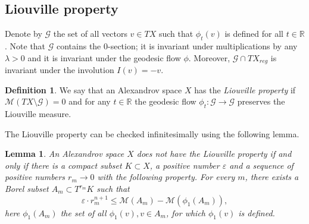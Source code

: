 \documentclass[12pt,leqno,intlimits]{amsart}
\numberwithin{equation}{section}
\newtheorem{lem}[thm]{Lemma}
\theoremstyle{definition}
\newtheorem{defn}[thm]{Definition}%
\theoremstyle{remark}
\newcommand{\R}{\mathbb{R}}
\def\:{\colon}
\begin{document}
\subsection{Liouville property}
Denote by $\mathcal G$ the set of all vectors $v\in TX $ such that $\phi _t(v)$ is defined for all $t\in \R$.
Note that $\mathcal G$ contains the $0$-section;
it is invariant under multiplications by any $\lambda>0$
and it is invariant under the geodesic flow $\phi$.
Moreover, $\mathcal G\cap TX_{reg}$ is invariant under the involution $I (v)=-v$.

\begin{defn}
We say that an Alexandrov space $X$ has the \emph{Liouville property} if $\mathcal M(TX\setminus \mathcal G)=0$ and
for any $t\in \R$ the geodesic flow $\phi _t \:\mathcal G\to \mathcal G$ preserves the Liouville measure.
\end{defn}

The Liouville property can be checked infinitesimally using the following lemma.

\begin{lem} \label{infini}
An Alexandrov space $X$ \emph{does not} have the Liouville property if and only if there is a compact subset $K\subset X$, a positive number
$\varepsilon$ and a sequence of positive numbers $r_m \to 0$ with the following property.
For every $m$, there exists a Borel subset $A_m\subset T^{r_ m} K$ such that
\begin{equation} \label{eq:m}
\varepsilon \cdot r_m^{n +1} \leq \mathcal M (A_m) -\mathcal M (\phi _1 (A_m)),
\end{equation}
here $\phi_1 (A_m)$ the set of all $\phi _1(v), v\in A_m$, for which
$\phi _1(v)$ is defined.
\end{lem}
\end{document}
